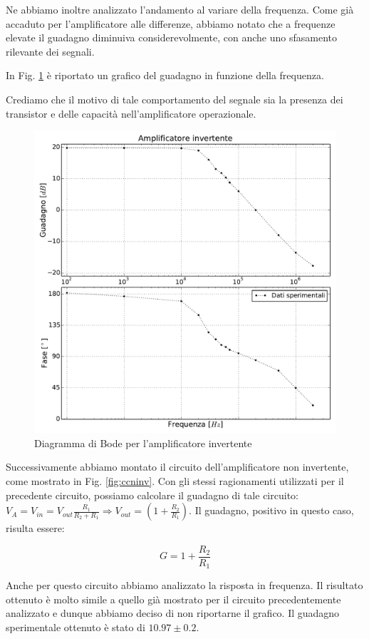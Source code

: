 Ne abbiamo inoltre analizzato l'andamento al variare della frequenza.
Come già accaduto per l'amplificatore alle differenze, abbiamo notato che a frequenze elevate il guadagno diminuiva considerevolmente, con anche uno sfasamento rilevante dei segnali.

In Fig. \ref{fig:invbode} è riportato un grafico del guadagno in funzione della frequenza. 


Crediamo che il motivo di tale comportamento %
del segnale sia la presenza dei transistor e delle capacità nell'amplificatore operazionale.
\begin{figure}
			\includegraphics[width=.48\textwidth]{b_inv.pdf}
			\caption{Diagramma di Bode per l'amplificatore invertente}
			\label{fig:invbode}
\end{figure}



Successivamente abbiamo montato il circuito dell'amplificatore non invertente, come mostrato in Fig. \ref{fig:ccninv}. Con gli stessi ragionamenti utilizzati per il precedente circuito, possiamo calcolare il guadagno di tale circuito: $V_A=V_{in}=V_{out}\frac{R_1}{R_2+R_1} \Rightarrow V_{out}=(1+\frac{R_2}{R_1})$. Il guadagno, positivo in questo caso, risulta essere: 

\begin{equation}
G=1+\frac{R_2}{R_1}
\end{equation}

Anche per questo circuito abbiamo analizzato la risposta in frequenza.
Il risultato ottenuto è molto simile a quello già mostrato per il circuito precedentemente analizzato e dunque abbiamo deciso di non riportarne il grafico. Il guadagno sperimentale ottenuto è stato di $10.97 \pm 0.2$.
